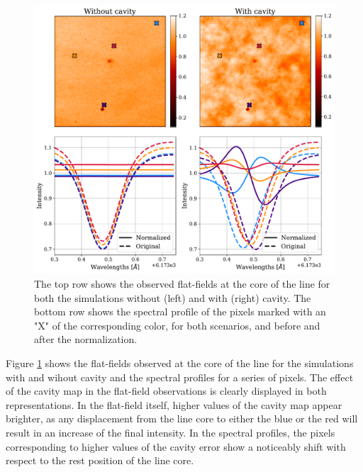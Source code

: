 \begin{figure}
  \begin{minipage}[c]{0.7\textwidth}
    \includegraphics[width=\textwidth]{figures/Mancha/Flat_field_normalization.pdf}
  \end{minipage}\hfill
  \begin{minipage}[c]{0.27\textwidth}
    \caption{
      The top row shows the observed flat-fields at the core of the line for both the simulations without (left) and with (right) cavity. The bottom row shows the spectral profile of the pixels marked with an "X" of the corresponding color, for both scenarios, and before and after the normalization.      
    \label{fig_mancha: flat_field normalization}} 
  \end{minipage}
\end{figure}

Figure \ref{fig_mancha: flat_field normalization} shows the flat-fields observed at the core of the line for the simulations with and wihout cavity and the spectral profiles for a series of pixels. The effect of the cavity map in the flat-field observations is clearly displayed in both representations. In the flat-field itself, higher values of the cavity map appear brighter, as any displacement from the line core to either the blue or the red will result in an increase of the final intensity. In the spectral profiles, the pixels corresponding to higher values of the cavity error show a noticeably shift with respect to the rest position of the line core.   

